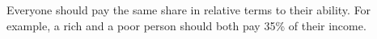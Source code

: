Everyone should pay the same share in relative terms to their ability.
For example, a rich and a poor person should both pay 35\% of their income.